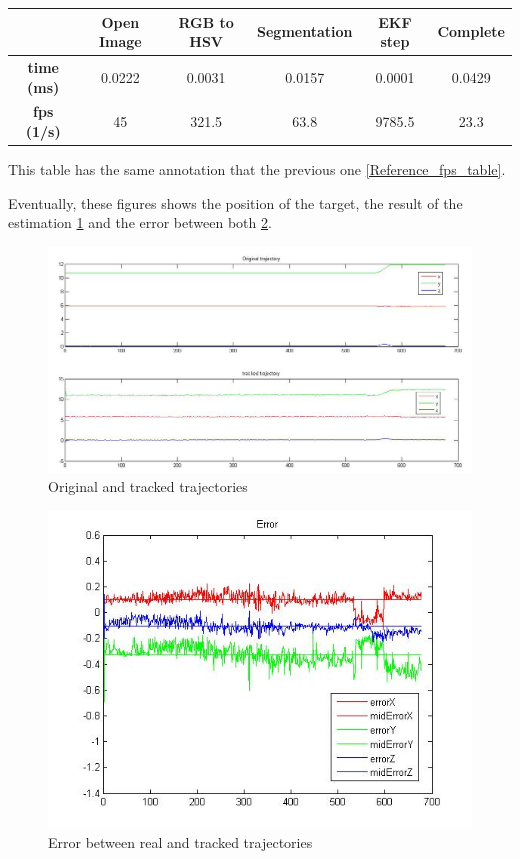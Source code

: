 	{                
	\centering
		\begin{tabular}{|c|c|c|c|c||c|}
		\hline  					&  Open Image	&  RGB to HSV 	& Segmentation 	& EKF step  & Complete \\ 
		\hline  \textbf{time (ms)}	&	0.0222		& 	0.0031 		&  	0.0157		&  	0.0001 	&  0.0429		\\ 
		\hline  \textbf{fps (1/s)}	& 	45 			& 	321.5 		& 	63.8 		& 9785.5	&  23.3		\\ 
		\hline 
		\end{tabular} 
	}
	\newline
	
	This table has the same annotation that the previous one \ref{Reference_fps_table}.
	
	Eventually, these figures shows the position of the target, the result of the estimation \ref{fig:trajectories_stereo_PC} and the error between both \ref{fig:errors_stereo_PC}.
	
	\begin{figure}[hp]
		\centering
		\includegraphics[width=\linewidth]{../Images/c4/trajs_stereo}
		\caption{Original and tracked trajectories}
		\label{fig:trajectories_stereo_PC}
	\end{figure}
	
	\begin{figure}[htp]
		\centering
		\includegraphics[width=0.7\linewidth]{../Images/c4/errors_stereo}
		\caption{Error between real and tracked trajectories}
		\label{fig:errors_stereo_PC}
	\end{figure}	
	
